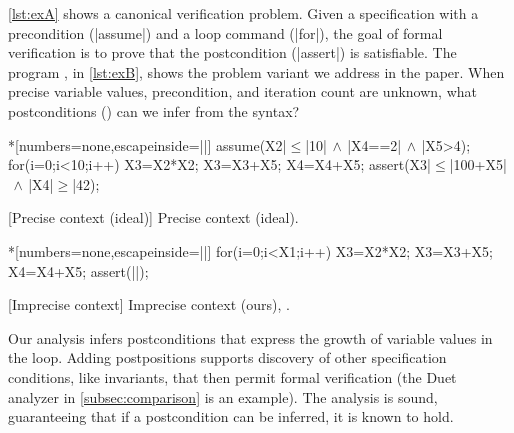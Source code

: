 \autoref{lst:exA} shows a canonical verification problem.
Given a specification with a precondition (\pr|assume|) and a loop command (\pr|for|), the goal of formal verification is to prove that the postcondition (\pr|assert|) is satisfiable.
The program \emph{\explain}, in \autoref{lst:exB}, shows the problem variant we address in the paper.
When precise variable values, precondition, and iteration count are unknown, what postconditions (\qtext) can we infer from the syntax?

\begin{center}
\begin{minipage}{.45\textwidth}
\captionsetup{type=lstlisting}
\begin{center}
\begin{minipage}{.9\textwidth}
\begin{implisting}*[numbers=none,escapeinside=||]
assume(X2|$\leq$|10|$\,\land\,$|X4==2|$\,\land\,$|X5>4);
for(i=0;i<10;i++) {
  X3=X2*X2;
  X3=X3+X5;
  X4=X4+X5; }
assert(X3|$\leq$|100+X5|$\,\land\,$|X4|$\geq$|42);
\end{implisting}
\end{minipage}
\end{center}
[Precise context (ideal)]
{Precise context (ideal).}\label{lst:exA}
\end{minipage}\hfill%
\begin{minipage}{.52\textwidth}
\captionsetup{type=lstlisting}
\begin{center}
\begin{minipage}{.85\textwidth}
\begin{implisting}*[numbers=none,escapeinside=||]
for(i=0;i<X1;i++) {
  X3=X2*X2;
  X3=X3+X5;
  X4=X4+X5; }
assert(|\myqm|);
\end{implisting}
\end{minipage}
\end{center}
[Imprecise context]
{Imprecise context (ours), \mbox{\explain}.}\label{lst:exB}
\end{minipage}
\end{center}

Our analysis infers postconditions that express the {growth of variable values} in the loop.
Adding postpositions supports discovery of other specification conditions, like invariants,
that then permit formal verification (the Duet analyzer in \autoref{subsec:comparison} is an example).
The analysis is sound, guaranteeing that if a postcondition can be inferred, it is known to hold.

